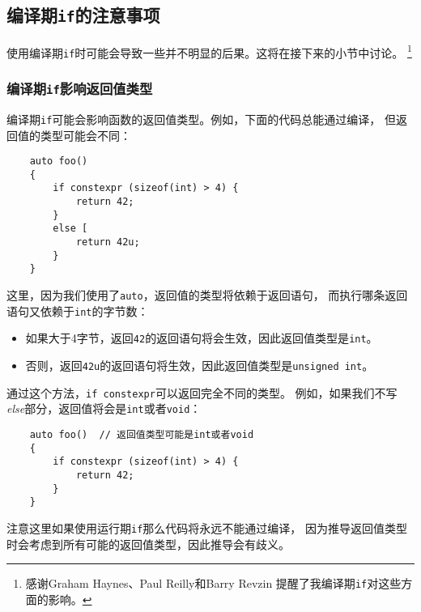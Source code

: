 \subsection{编译期\texttt{if}的注意事项}
使用编译期\texttt{if}时可能会导致一些并不明显的后果。这将在接下来的小节中讨论。
\footnote{感谢Graham Haynes、Paul Reilly和Barry Revzin
提醒了我编译期\texttt{if}对这些方面的影响。}

\subsubsection{编译期\texttt{if}影响返回值类型}
编译期\texttt{if}可能会影响函数的返回值类型。例如，下面的代码总能通过编译，
但返回值的类型可能会不同：
\begin{lstlisting}
    auto foo()
    {
        if constexpr (sizeof(int) > 4) {
            return 42;
        }
        else [
            return 42u;
        }
    }
\end{lstlisting}
这里，因为我们使用了\texttt{auto}，返回值的类型将依赖于返回语句，
而执行哪条返回语句又依赖于\texttt{int}的字节数：
\begin{itemize}
    \item 如果大于4字节，返回\texttt{42}的返回语句将会生效，因此返回值类型是\texttt{int}。
    \item 否则，返回\texttt{42u}的返回语句将生效，因此返回值类型是\texttt{unsigned int}。
\end{itemize}
通过这个方法，\texttt{if constexpr}可以返回完全不同的类型。
例如，如果我们不写\emph{else}部分，返回值将会是\texttt{int}或者\texttt{void}：
\begin{lstlisting}
    auto foo()  // 返回值类型可能是int或者void
    {
        if constexpr (sizeof(int) > 4) {
            return 42;
        }
    }
\end{lstlisting}
注意这里如果使用运行期\texttt{if}那么代码将永远不能通过编译，
因为推导返回值类型时会考虑到所有可能的返回值类型，因此推导会有歧义。

